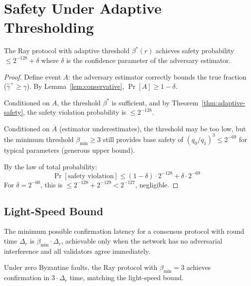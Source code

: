 \section{Safety Under Adaptive Thresholding}

\label{sec:safety}

\begin{theorem}
\label{thm:ray-safety}
The Ray protocol with adaptive threshold $\beta^*(r)$ achieves safety probability
$\leq 2^{-128} + \delta$ where $\delta$ is the confidence parameter of the adversary
estimator.
\end{theorem}

\begin{proof}
Define event $A$: the adversary estimator correctly bounds the true fraction
($\hat{\gamma}^+ \geq \gamma$). By Lemma~\ref{lem:conservative}, $\Pr[A] \geq 1 - \delta$.

Conditioned on $A$, the threshold $\beta^*$ is sufficient, and by Theorem~\ref{thm:adaptive-safety},
the safety violation probability is $\leq 2^{-128}$.

Conditioned on $\overline{A}$ (estimator underestimates), the threshold may be too low,
but the minimum threshold $\beta_{\min} \geq 3$ still provides base safety of
$(q_0/q_1)^3 \leq 2^{-69}$ for typical parameters (generous upper bound).

By the law of total probability:
\[
\Pr[\text{safety violation}] \leq (1 - \delta) \cdot 2^{-128} + \delta \cdot 2^{-69}
\]
For $\delta = 2^{-60}$, this is $\leq 2^{-128} + 2^{-129} < 2^{-127}$, negligible.
\end{proof}

\subsection{Light-Speed Bound}

\begin{definition}
The minimum possible confirmation latency for a consensus protocol with round time
$\Delta_r$ is $\beta_{\min} \cdot \Delta_r$, achievable only when the network has no
adversarial interference and all validators agree immediately.
\end{definition}

\begin{proposition}
\label{prop:lightspeed}
Under zero Byzantine faults, the Ray protocol with $\beta_{\min} = 3$ achieves
confirmation in $3 \cdot \Delta_r$ time, matching the light-speed bound.
\end{proposition}

